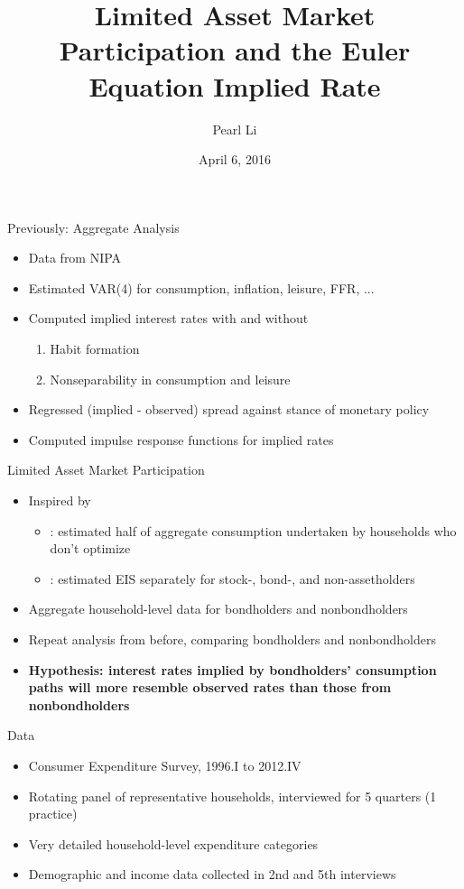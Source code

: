 \documentclass{beamer}
\title[Implied Rates]{\textbf{Limited Asset Market Participation} and the Euler Equation Implied Rate}
\author{Pearl Li}
\date{April 6, 2016}
\begin{document}
\begin{frame}
\titlepage
\end{frame}

\begin{frame}{Previously: Aggregate Analysis}
\begin{itemize}
\item Data from NIPA
\item Estimated VAR(4) for consumption, inflation, leisure, FFR, ...
\item Computed implied interest rates with and without
  \begin{enumerate}
  \item Habit formation
  \item Nonseparability in consumption and leisure
  \end{enumerate}
\item Regressed (implied - observed) spread against stance of monetary policy
\item Computed impulse response functions for implied rates
\end{itemize}
\end{frame}

\begin{frame}{Limited Asset Market Participation}
\begin{itemize}
\item Inspired by
  \begin{itemize}
  \item \cite{campbell89}: estimated half of aggregate consumption undertaken by households who don't optimize
  \item \cite{vissing02}: estimated EIS separately for stock-, bond-, and non-assetholders
  \end{itemize}
\item Aggregate household-level data for bondholders and nonbondholders
\item Repeat analysis from before, comparing bondholders and nonbondholders
\item \textbf{Hypothesis: interest rates implied by bondholders' consumption paths will more resemble observed rates than those from nonbondholders}
\end{itemize}
\end{frame}

\begin{frame}{Data}
\begin{itemize}
\item Consumer Expenditure Survey, 1996.I to 2012.IV
\item Rotating panel of representative households, interviewed for 5 quarters (1 practice)
\item Very detailed household-level expenditure categories
\item Demographic and income data collected in 2nd and 5th interviews
\end{itemize}
\end{frame}
\end{document}
